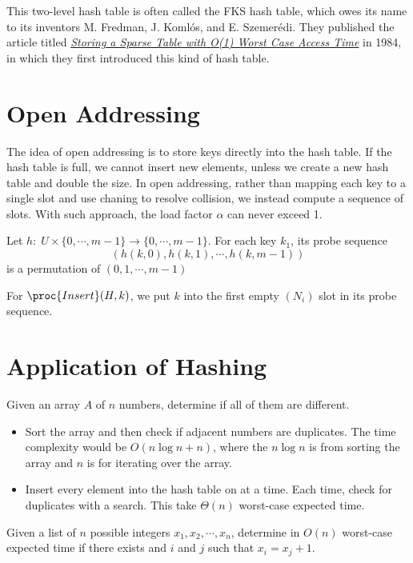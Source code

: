 \begin{remark}
    This two-level hash table is often called the FKS hash table, which owes its name to its inventors M. Fredman, J. Koml\'{o}s, and E. Szemer\'{e}di. They published the article titled \href{https://www.cs.dartmouth.edu/~ac/Teach/CS105-Winter05/Handouts/fks-perfecthash.pdf}{\textit{Storing a Sparse Table with O(1) Worst Case Access Time}} in 1984, in which they first introduced this kind of hash table.
\end{remark}

\section{Open Addressing}  

The idea of open addressing is to store keys directly into the hash table. If the hash table is full, we cannot insert new elements, unless we create a new hash table and double the size. In open addressing, rather than mapping each key to a single slot and use chaning to resolve collision, we instead compute a sequence of slots. With such approach, the load factor $\alpha$ can never exceed 1.

Let $h:\; U \times \{0,\cdots,m-1\} \to \{0,\cdots,m-1\}$. For each key $k_1$, its probe sequence 
$$
(h(k,0), h(k,1),\cdots, h(k,m-1))
$$
is a permutation of $(0,1,\cdots,m-1)$ 

For $\proc{Insert}(H,k)$, we put $k$ into the first empty $(N_i)$ slot in its probe sequence.

\section{Application of Hashing}

Given an array $A$ of $n$ numbers, determine if all of them are different.

\begin{itemize}
    \item Sort the array and then check if adjacent numbers are duplicates. The time complexity would be $O(n\log n + n)$, where the $n\log n$ is from sorting the array and $n$ is for iterating over the array.
    \item Insert every element into the hash table on at a time. Each time, check for duplicates with a search. This take $\Theta(n)$ worst-case expected time.
\end{itemize}

Given a list of $n$ possible integers $x_1,x_2,\cdots,x_n$, determine in $O(n)$ worst-case expected time if there exists and $i$ and $j$ such that $x_i = x_j + 1$.